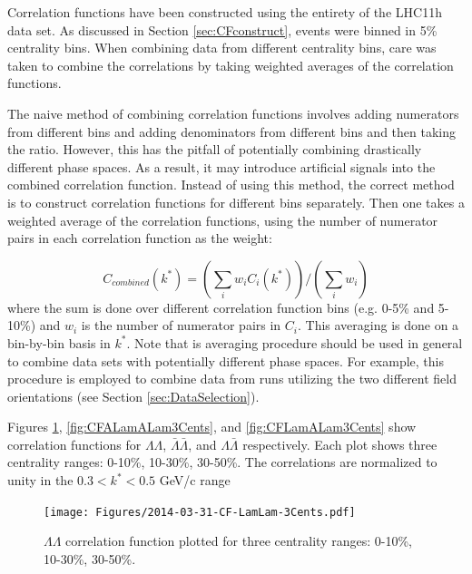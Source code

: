 


Correlation functions have been constructed using the entirety of the LHC11h data set.  As discussed in Section \ref{sec:CFconstruct}, events were binned in 5\% centrality bins.  When combining data from different centrality bins, care was taken to combine the correlations by taking weighted averages of the correlation functions.  

The naive method of combining correlation functions involves adding numerators from different bins and adding denominators from different bins and then taking the ratio.  However, this has the pitfall of potentially combining drastically different phase spaces.  As a result, it may introduce artificial signals into the combined correlation function.  Instead of using this method, the correct method is to construct correlation functions for different bins separately.  Then one takes a weighted average of the correlation functions, using the number of numerator pairs in each correlation function as the weight:

\begin{equation}
\label{eq:CombineCF}
C_{combined}(k^*) = (\displaystyle\sum\limits_{i} w_i C_i(k^*))/(\displaystyle\sum\limits_{i} w_i)
\end{equation}
where the sum is done over different correlation function bins (e.g. 0-5\% and 5-10\%) and $w_i$ is the number of numerator pairs in $C_i$.  This averaging is done on a bin-by-bin basis in $k^*$.  Note that is averaging procedure should be used in general to combine data sets with potentially different phase spaces. For example, this procedure is employed to combine data from runs utilizing the two different field orientations (see Section \ref{sec:DataSelection}).  

Figures \ref{fig:CFLamLam3Cents}, \ref{fig:CFALamALam3Cents}, and \ref{fig:CFLamALam3Cents} show correlation functions for $\Lambda\Lambda$, $\bar{\Lambda}\bar{\Lambda}$, and $\Lambda\bar{\Lambda}$ respectively.  Each plot shows three centrality ranges: 0-10\%, 10-30\%, 30-50\%. The correlations are normalized to unity in the $ 0.3 < k^* < 0.5$ GeV/c range 




\begin{figure}[hbtp]
\texttt{[image: Figures/2014-03-31-CF-LamLam-3Cents.pdf]}
\caption[$\Lambda\Lambda$ correlation function for three centrality ranges]{$\Lambda\Lambda$ correlation function plotted for three centrality ranges: 0-10\%, 10-30\%, 30-50\%.}
\label{fig:CFLamLam3Cents}
\end{figure}

